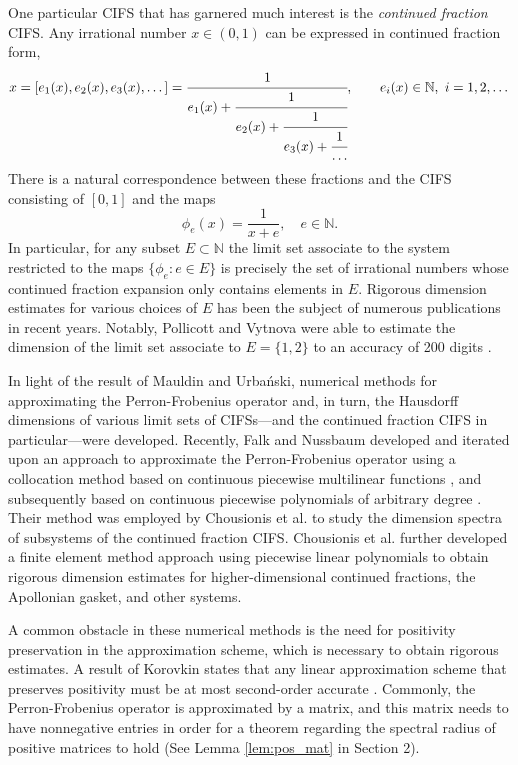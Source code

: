 \documentclass[10pt]{article}
\theoremstyle{definition}
\numberwithin{equation}{section}
\numberwithin{figure}{section}
\numberwithin{table}{section}
\begin{document}
One particular CIFS that has garnered much interest is the \textit{continued fraction} CIFS. Any irrational number $x\in(0,1)$ can be expressed in continued fraction form,
$$x=[e_1(x),e_2(x),e_3(x),\dots]=\cfrac{1}{e_1(x)+\cfrac{1}{e_2(x)+\cfrac{1}{e_3(x)+\cfrac{1}{\dots}}}},\quad\quad e_i(x)\in\mathbb{N},\ i=1,2,\dots$$
There is a natural correspondence between these fractions and the CIFS consisting of $[0,1]$ and the maps
$$\phi_e(x)=\frac{1}{x+e},\quad e\in \mathbb{N}.$$
In particular, for any subset $E\subset\mathbb{N}$ the limit set associate to the system restricted to the maps $\{\phi_e:e\in E\}$ is precisely the set of irrational numbers whose continued fraction expansion only contains elements in $E$. Rigorous dimension estimates for various choices of $E$ has been the subject of numerous publications in recent years. Notably, Pollicott and Vytnova were able to estimate the dimension of the limit set associate to $E=\{1,2\}$ to an accuracy of 200 digits \cite{pollicott2022hausdorff}.

In light of the result of Mauldin and Urba\'{n}ski, numerical methods for approximating the Perron-Frobenius operator and, in turn, the Hausdorff dimensions of various limit sets of CIFSs—and the continued fraction CIFS in particular—were developed. Recently, Falk and Nussbaum developed and iterated upon an approach to approximate the Perron-Frobenius operator using a collocation method based on continuous piecewise multilinear functions \cite{falk2018new,falk2018c}, and subsequently based on continuous piecewise polynomials of arbitrary degree \cite{falk2021hidden}. Their method was employed by Chousionis et al. \cite{chousionis2020dimension} to study the dimension spectra of subsystems of the continued fraction CIFS. Chousionis et al. \cite{chousionis2024rigorous} further developed a finite element method approach using piecewise linear polynomials to obtain rigorous dimension estimates for higher-dimensional continued fractions, the Apollonian gasket, and other systems.

A common obstacle in these numerical methods is the need for positivity preservation in the approximation scheme, which is necessary to obtain rigorous estimates. A result of Korovkin states that any linear approximation scheme that preserves positivity must be at most second-order accurate \cite{korovkin1957order}. Commonly, the Perron-Frobenius operator is approximated by a matrix, and this matrix needs to have nonnegative entries in order for a theorem regarding the spectral radius of positive matrices to hold (See Lemma \ref{lem:pos_mat} in Section 2). 
\end{document}
